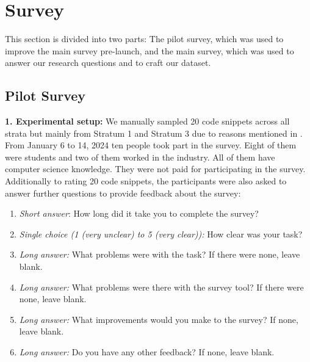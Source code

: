 \documentclass[%
class=scrreprt,
chapterprefix=false,%
open=right,%
twoside=true,%
paper=a4,%
logofile={Logo\_zentral\_farbig\_EN.png},%
thesistype=master,%
UKenglish,%
]{se2thesis}
\theoremstyle{definition}
\newcommand{\rdh}{REDEC\xspace}
\begin{document}
\section{Survey} \label{Survey}
	This section is divided into two parts: The pilot survey, which was used to improve the main survey pre-launch, and the main survey, which was used to answer our research questions and to craft our dataset.
	
\subsection{Pilot Survey} \label{Pilot Survey}
	
	\textbf{1. Experimental setup:}
	We manually sampled 20 code snippets across all strata but mainly from Stratum 1 and Stratum 3 due to reasons mentioned in . From January 6 to 14, 2024 ten people took part in the survey. Eight of them were students and two of them worked in the industry. All of them have computer science knowledge. They were not paid for participating in the survey. Additionally to rating 20 code snippets, the participants were also asked to answer further questions to provide feedback about the survey:
	
	\begin{enumerate}
		\item \textit{Short answer}: How long did it take you to complete the survey?
		\item \textit{Single choice (1 (very unclear) to 5 (very clear)):} How clear was your task?
		\item \textit{Long answer:} What problems were with the task? If there were none, leave blank.
		\item \textit{Long answer:} What problems were there with the survey tool? If there were none, leave blank.
		\item \textit{Long answer:} What improvements would you make to the survey? If none, leave blank.
		\item \textit{Long answer:} Do you have any other feedback? If none, leave blank.
	\end{enumerate}
	
	
	
\end{document}
